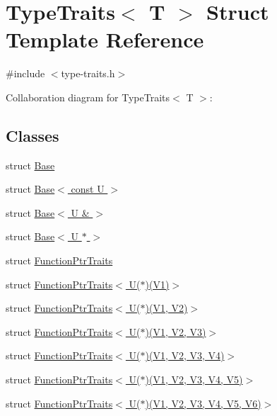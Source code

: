 \hypertarget{structTypeTraits}{}\section{Type\+Traits$<$ T $>$ Struct Template Reference}
\label{structTypeTraits}


{\ttfamily \#include $<$type-\/traits.\+h$>$}



Collaboration diagram for Type\+Traits$<$ T $>$\+:
\subsection*{Classes}
\begin{DoxyCompactItemize}
\item 
struct \hyperlink{structTypeTraits_1_1Base}{Base}
\item 
struct \hyperlink{structTypeTraits_1_1Base_3_01const_01U_01_4}{Base$<$ const U $>$}
\item 
struct \hyperlink{structTypeTraits_1_1Base_3_01U_01_6_01_4}{Base$<$ U \& $>$}
\item 
struct \hyperlink{structTypeTraits_1_1Base_3_01U_01_5_01_4}{Base$<$ U $\ast$ $>$}
\item 
struct \hyperlink{structTypeTraits_1_1FunctionPtrTraits}{Function\+Ptr\+Traits}
\item 
struct \hyperlink{structTypeTraits_1_1FunctionPtrTraits_3_01U_07_5_08_07V1_08_4}{Function\+Ptr\+Traits$<$ U($\ast$)(\+V1)$>$}
\item 
struct \hyperlink{structTypeTraits_1_1FunctionPtrTraits_3_01U_07_5_08_07V1_00_01V2_08_4}{Function\+Ptr\+Traits$<$ U($\ast$)(\+V1, V2)$>$}
\item 
struct \hyperlink{structTypeTraits_1_1FunctionPtrTraits_3_01U_07_5_08_07V1_00_01V2_00_01V3_08_4}{Function\+Ptr\+Traits$<$ U($\ast$)(\+V1, V2, V3)$>$}
\item 
struct \hyperlink{structTypeTraits_1_1FunctionPtrTraits_3_01U_07_5_08_07V1_00_01V2_00_01V3_00_01V4_08_4}{Function\+Ptr\+Traits$<$ U($\ast$)(\+V1, V2, V3, V4)$>$}
\item 
struct \hyperlink{structTypeTraits_1_1FunctionPtrTraits_3_01U_07_5_08_07V1_00_01V2_00_01V3_00_01V4_00_01V5_08_4}{Function\+Ptr\+Traits$<$ U($\ast$)(\+V1, V2, V3, V4, V5)$>$}
\item 
struct \hyperlink{structTypeTraits_1_1FunctionPtrTraits_3_01U_07_5_08_07V1_00_01V2_00_01V3_00_01V4_00_01V5_00_01V6_08_4}{Function\+Ptr\+Traits$<$ U($\ast$)(\+V1, V2, V3, V4, V5, V6)$>$}

\end{DoxyCompactItemize}
